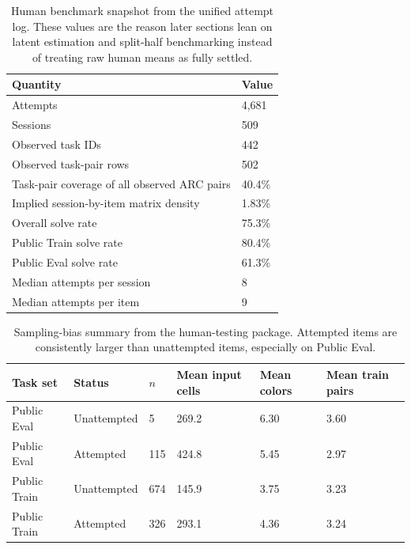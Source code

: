 \documentclass[11pt,letterpaper]{article}
\begin{document}
\begin{table}[H]
\centering
\small
\caption{Human benchmark snapshot from the unified attempt log. These values are the reason later sections lean on latent estimation and split-half benchmarking instead of treating raw human means as fully settled.}
\begin{tabular}{p{3.2in}p{1.5in}}
\toprule
\textbf{Quantity} & \textbf{Value} \\
\midrule
Attempts & 4,681 \\
Sessions & 509 \\
Observed task IDs & 442 \\
Observed task-pair rows & 502 \\
Task-pair coverage of all observed ARC pairs & 40.4\% \\
Implied session-by-item matrix density & 1.83\% \\
Overall solve rate & 75.3\% \\
Public Train solve rate & 80.4\% \\
Public Eval solve rate & 61.3\% \\
Median attempts per session & 8 \\
Median attempts per item & 9 \\
\bottomrule
\end{tabular}
\end{table}

\begin{table}[H]
\centering
\scriptsize
\caption{Sampling-bias summary from the human-testing package. Attempted items are consistently larger than unattempted items, especially on Public Eval.}
\begin{tabular}{p{1.0in}p{0.9in}p{0.55in}p{0.8in}p{0.8in}p{0.8in}}
\toprule
\textbf{Task set} & \textbf{Status} & \textbf{$n$} & \textbf{Mean input cells} & \textbf{Mean colors} & \textbf{Mean train pairs} \\
\midrule
Public Eval & Unattempted & 5 & 269.2 & 6.30 & 3.60 \\
Public Eval & Attempted & 115 & 424.8 & 5.45 & 2.97 \\
Public Train & Unattempted & 674 & 145.9 & 3.75 & 3.23 \\
Public Train & Attempted & 326 & 293.1 & 4.36 & 3.24 \\
\bottomrule
\end{tabular}
\end{table}
\end{document}
